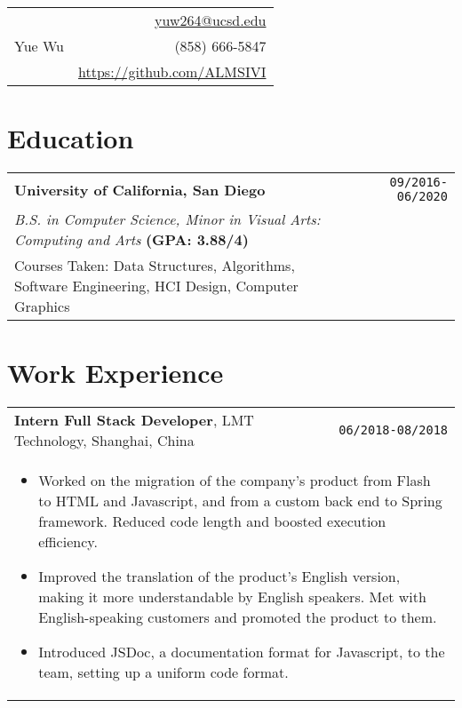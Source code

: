 \documentclass[10pt, letterpaper]{article}
\begin{document}
\noindent
\begin{tabularx}{\linewidth}{X r}
	\multirow{3}{*}{{\fontsize{40}{50}\selectfont Yue Wu}}
	& \href{mailto:yuw264@ucsd.edu}{yuw264@ucsd.edu} \\
	& (858) 666-5847 \\
	& \href{https://github.com/ALMSIVI}{https://github.com/ALMSIVI}
\end{tabularx}

\begin{comment}
\noindent
\textbf{Currently looking for a software engineering intern for Summer 2019 (Jun-Sep).}
\end{comment}

\begin{comment}
\begin{tabularx}{\linewidth}{X r}
\multirow{4}{*}{{\fontsize{45}{60}\selectfont Yue Wu}} 
& \href{mailto:yuw264@ucsd.edu}{yuw264@ucsd.edu} \\
& (858) 666-5847 \\
& 8840 Costa Verde Blvd. Apt. 3322 \\
& San Diego, CA 92122
\end{tabularx}
\end{comment}


\section{Education}
\smallskip
\noindent
\begin{tabularx}{\linewidth}{X r}
	\textbf{\large University of California, San Diego} & \texttt{09/2016-06/2020} \\
	\textit{B.S. in Computer Science, Minor in Visual Arts: Computing and Arts} \textbf{(GPA: 3.88/4)} & \\
	Courses Taken: Data Structures, Algorithms, Software Engineering, HCI Design, Computer Graphics
\end{tabularx}


\section{Work Experience}
\smallskip
\noindent
\begin{tabularx}{\textwidth}{X r}
	\textbf{\large Intern Full Stack Developer}, LMT Technology, Shanghai, China & \texttt{06/2018-08/2018} \\
	\multicolumn{2}{p{\linewidth}}{
		\begin{itemize}
			\item Worked on the migration of the company's product from Flash to HTML and Javascript, and from a custom back end to Spring framework. Reduced code length and boosted execution efficiency.
			\item Improved the translation of the product's English version, making it more understandable by English speakers. Met with English-speaking customers and promoted the product to them. 
			\item Introduced JSDoc, a documentation format for Javascript, to the team, setting up a uniform code format.
		\end{itemize}
	} 
\end{tabularx}
\end{document}
